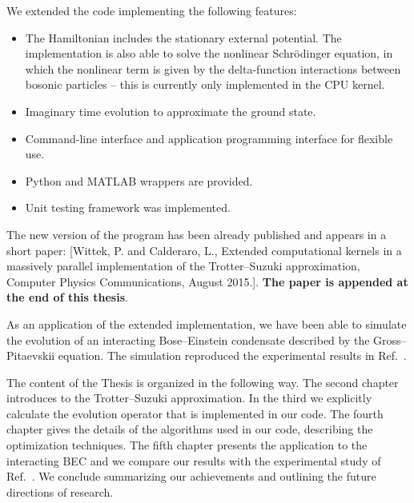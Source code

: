 We extended the code implementing the following features:
\begin{itemize}
\item The Hamiltonian includes the stationary external potential. The implementation is also able to solve the nonlinear Schr\"odinger equation, in which the nonlinear term is given by the delta-function interactions between bosonic particles -- this is currently only implemented in the CPU kernel.

\item Imaginary time evolution to approximate the ground state.

\item Command-line interface and application programming interface for flexible use.

\item Python and MATLAB wrappers are provided.

\item Unit testing framework was implemented.

\end{itemize}
The new version of the program has been already published and appears in a short paper: [Wittek, P. and Calderaro, L., Extended computational kernels in a massively parallel implementation of the Trotter--Suzuki approximation, Computer Physics Communications, August 2015.]. \textbf{The paper is appended at the end of this thesis}.

As an application of the extended implementation, we have been able to simulate the evolution of an interacting Bose--Einstein condensate described by the Gross--Pitaevskii equation. The simulation reproduced the experimental results in Ref.~\citep{DSF00}.

The content of the Thesis is organized in the following way. The second chapter introduces to the Trotter--Suzuki approximation. In the third we explicitly calculate the evolution operator that is implemented in our code. The fourth chapter gives the details of the algorithms used in our code, describing the optimization techniques. The fifth chapter presents the application to the interacting BEC and we compare our results with the experimental study of Ref.~\citep{DSF00}. We conclude summarizing our achievements and outlining the future directions of research.